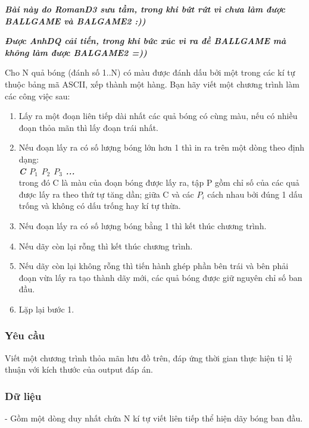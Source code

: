 







\textbf{\emph{     Bài này do RomanD3 sưu tầm, trong khi bứt rứt vì chưa làm được BALLGAME và BALGAME2 :))    }}

\textbf{\emph{     Được AnhDQ cải tiến, trong khi bức xúc vì ra đề BALLGAME mà không làm được BALGAME2 =))    }}

   Cho N quả bóng (đánh số 1..N) có màu được đánh dấu bởi một trong các kí tự thuộc bảng mã ASCII, xếp thành một hàng. Bạn hãy viết một chương trình làm các công việc sau:  
\begin{enumerate}
	\item     Lấy ra một đoạn liên tiếp dài nhất các quả bóng có cùng màu, nếu có nhiều đoạn thỏa mãn thì lấy đoạn trái nhất.   
	\item     Nếu đoạn lấy ra có số lượng bóng lớn hơn 1 thì in ra trên một dòng theo định dạng:    
\\\textbf{\emph{      C $P_{1}$      $P_{2}$      $P_{3}$      ...     }}
\\    trong đó C là màu của đoạn bóng được lấy ra, tập P gồm chỉ số của các quả được lấy ra theo thứ tự tăng dần; giữa C và các $P_{i}$    cách nhau bởi đúng 1 dấu trống và không có dấu trống hay kí tự thừa.   
	\item     Nếu đoạn lấy ra có số lượng bóng bằng 1 thì kết thúc chương trình.   
	\item     Nếu dãy còn lại rỗng thì kết thúc chương trình.   
	\item     Nếu dãy còn lại không rỗng thì tiến hành ghép phần bên trái và bên phải đoạn vừa lấy ra tạo thành dãy mới, các quả bóng được giữ nguyên chỉ số ban đầu.   
	\item     Lặp lại bước 1.   
\end{enumerate}

\subsubsection{   Yêu cầu  }

   Viết một chương trình thỏa mãn lưu đồ trên, đáp ứng thời gian thực hiện tỉ lệ thuận với kích thước của output đáp án.  

\subsubsection{   Dữ liệu  }

   - Gồm một dòng duy nhất chứa N kí tự viết liên tiếp thể hiện dãy bóng ban đầu.  

